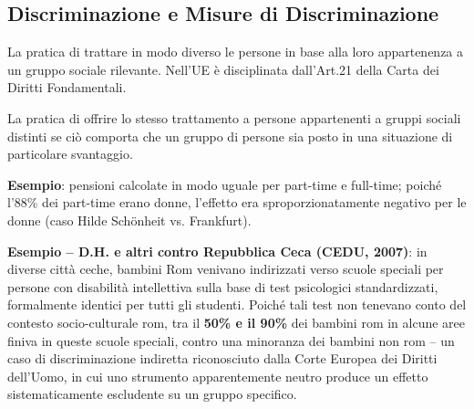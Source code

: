 \documentclass[a4paper,11pt]{article}
\begin{document}
\begin{center}
\end{center}

\subsection{Discriminazione e Misure di Discriminazione}

\begin{definizione}
La pratica di trattare in modo diverso le persone in base alla loro appartenenza a un gruppo sociale rilevante. Nell'UE \`{e} disciplinata dall'Art.21 della Carta dei Diritti Fondamentali.
\end{definizione}

\begin{definizione}
La pratica di offrire lo stesso trattamento a persone appartenenti a gruppi sociali distinti se ci\`{o} comporta che un gruppo di persone sia posto in una situazione di particolare svantaggio.

\textbf{Esempio}: pensioni calcolate in modo uguale per part-time e full-time; poich\'{e} l'88\% dei part-time erano donne, l'effetto era sproporzionatamente negativo per le donne (caso Hilde Sch\"{o}nheit vs. Frankfurt).

\textbf{Esempio -- D.H. e altri contro Repubblica Ceca (CEDU, 2007)}: in diverse citt\`{a} ceche, bambini Rom venivano indirizzati verso scuole speciali per persone con disabilit\`{a} intellettiva sulla base di test psicologici standardizzati, formalmente identici per tutti gli studenti. Poich\'{e} tali test non tenevano conto del contesto socio-culturale rom, tra il \textbf{50\% e il 90\%} dei bambini rom in alcune aree finiva in queste scuole speciali, contro una minoranza dei bambini non rom -- un caso di discriminazione indiretta riconosciuto dalla Corte Europea dei Diritti dell'Uomo, in cui uno strumento apparentemente neutro produce un effetto sistematicamente escludente su un gruppo specifico.
\end{definizione}
\end{document}
